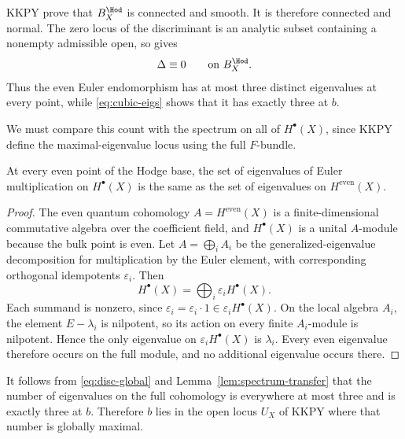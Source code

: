 KKPY prove that $B_X^{\Hod}$ is connected and smooth.  It is therefore
connected and normal.  The zero locus of the discriminant is an analytic
subset containing a nonempty admissible open, so \cite[Lemma~2.1.4]{Conrad}
gives
\begin{equation}\label{eq:disc-global}
  \Delta\equiv0\qquad\text{on }B_X^{\Hod}.
\end{equation}
Thus the even Euler endomorphism has at most three distinct eigenvalues at
every point, while \eqref{eq:cubic-eigs} shows that it has exactly three at
$b$.

We must compare this count with the spectrum on all of $H^\bullet(X)$, since
KKPY define the maximal-eigenvalue locus using the full $F$-bundle.

\begin{lemma}\label{lem:spectrum-transfer}
%
%
At every even point of the Hodge base, the set of eigenvalues of Euler
multiplication on $H^\bullet(X)$ is the same as the set of eigenvalues on
$H^{\mathrm{even}}(X)$.
\end{lemma}

\begin{proof}
The even quantum cohomology $A=H^{\mathrm{even}}(X)$ is a finite-dimensional
commutative algebra over the coefficient field, and $H^\bullet(X)$ is a
unital $A$-module because the bulk point is even.  Let
$A=\bigoplus_i A_i$ be the generalized-eigenvalue decomposition for
multiplication by the Euler element, with corresponding orthogonal
idempotents $\varepsilon_i$.  Then
\[
  H^\bullet(X)=\bigoplus_i\varepsilon_iH^\bullet(X).
\]
Each summand is nonzero, since
$\varepsilon_i=\varepsilon_i\cdot1\in\varepsilon_iH^\bullet(X)$.  On the
local algebra $A_i$, the element $E-\lambda_i$ is nilpotent, so its action on
every finite $A_i$-module is nilpotent.  Hence the only eigenvalue on
$\varepsilon_iH^\bullet(X)$ is $\lambda_i$.  Every even eigenvalue therefore
occurs on the full module, and no additional eigenvalue occurs there.
\end{proof}

It follows from \eqref{eq:disc-global} and Lemma~\ref{lem:spectrum-transfer}
that the number of eigenvalues on the full cohomology is everywhere at most
three and is exactly three at $b$.  Therefore $b$ lies in the open locus
$U_X$ of KKPY where that number is globally maximal.

